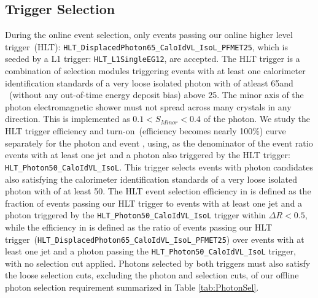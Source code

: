 \subsection{Trigger Selection}
During the online event selection, only events passing our online higher level trigger~(HLT): \texttt{HLT\_DisplacedPhoton65\_CaloIdVL\_IsoL\_PFMET25}, which is 
seeded by a L1 trigger: \texttt{HLT\_L1SingleEG12}, are accepted. The HLT trigger is a combination of selection modules triggering events with at least one calorimeter identification standards of a very loose isolated photon with \pt of atleast 65\GeVc and \ETslash\hspace{0.15cm}~(without any out-of-time energy deposit bias) above 25\GeV. The minor axis of the photon electromagnetic shower must not spread across many crystals in any direction. This is implemented as $ 0.1 < S_{Minor} < 0.4$ of the photon.
\newline
We study the HLT trigger efficiency and turn-on~(efficiency becomes nearly 100\%) curve separately for the photon \pt and event \ETslash\hspace{0.15cm}, using, as the denominator of the event ratio events with at least one jet and a photon also triggered by the HLT trigger: \texttt{HLT\_Photon50\_CaloIdVL\_IsoL}. This trigger selects events with photon candidates also satisfying the calorimeter identification standards of a very loose isolated photon with \pt of at least 50\GeVc.
The HLT event selection efficiency in \pt is defined as the fraction of events passing our HLT trigger to events with at least one jet and a photon triggered by the \texttt{HLT\_Photon50\_CaloIdVL\_IsoL} trigger within $\Delta R < 0.5$, while the efficiency in \ETslash\hspace{0.15cm} is defined as the ratio of events passing our HLT trigger~(\texttt{HLT\_DisplacedPhoton65\_CaloIdVL\_IsoL\_PFMET25}) over events with at least one jet and a photon passing  the \texttt{HLT\_Photon50\_CaloIdVL\_IsoL} trigger, with no \ETslash\hspace{0.15cm} selection cut applied.
Photons selected by both triggers must also satisfy the loose selection cuts, excluding the photon \pt  and \ETslash\hspace{0.15cm} selection cuts, of our offline photon selection requirement summarized in Table \ref{tab:PhotonSel}.

